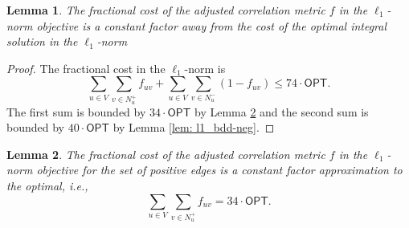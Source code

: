 \documentclass[11pt]{article}
\newtheorem{lemma}{Lemma}
\begin{document}
\begin{lemma}
    The fractional cost of the adjusted correlation metric $f$ in the $\ell_1$-norm objective is a constant factor away from the cost of the optimal integral solution in the $\ell_1$-norm
\end{lemma}
\begin{proof}
The fractional cost in the $\ell_1$-norm is
     $$\sum_{u \in V} \sum_{v \in N_u^+} f_{uv} + \sum_{u \in V} \sum_{v \in N_u^-} (1-f_{uv}) \leq 74 \cdot \textsf{OPT}.$$
The first sum is bounded by $34\cdot \textsf{OPT}$ by Lemma \ref{lem: l1_bdd-pos} and the second sum is bounded by $40\cdot \textsf{OPT}$ by Lemma \ref{lem: l1_bdd-neg}. 
\end{proof}



\begin{lemma} \label{lem: l1_bdd-pos}
    The fractional cost of the adjusted correlation metric $f$ in the $\ell_1$-norm objective for the set of positive edges is a constant factor approximation to the optimal, i.e.,
    $$ \sum_{u \in V} \sum_{v \in N_u^+} f_{uv} = 34 \cdot \textsf{OPT}.$$
\end{lemma}
\end{document}
